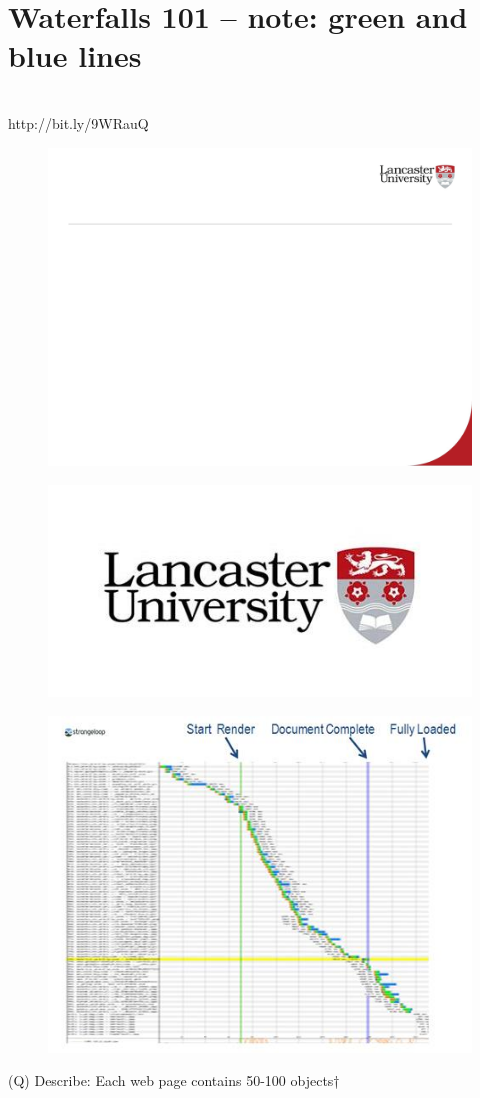 \documentclass[12pt]{article}
\begin{document}
\section{Waterfalls 101 – note: green and blue lines}
\\
http://bit.ly/9WRauQ\\
\begin{figure}[H]
\includegraphics[width=0.5\linewidth]{page37-image-1.png}
\end{figure}
\begin{figure}[H]
\includegraphics[width=0.5\linewidth]{page37-image-2.png}
\end{figure}
\begin{figure}[H]
\includegraphics[width=0.5\linewidth]{page37-image-3.png}
\end{figure}
\clearpage
(Q)
Describe: Each web page contains 50-100 objects†
\clearpage
\end{document}
